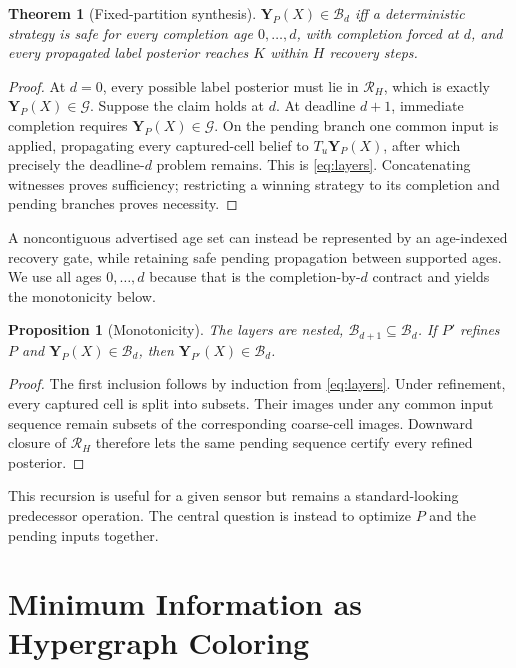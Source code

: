 \documentclass[letterpaper,10pt,conference]{ieeeconf}
\newtheorem{theorem}{Theorem}
\newtheorem{proposition}{Proposition}
\newcommand{\cR}{\mathcal R}
\newcommand{\cB}{\mathcal B}
\begin{document}
\begin{theorem}[Fixed-partition synthesis]\label{thm:fixed}
\mbox{$\mathbf Y_P(X)\in\cB_d$} iff a deterministic strategy is safe for every completion age
$0,\ldots,d$, with completion forced at $d$, and every propagated label posterior reaches $K$
within $H$ recovery steps.
\end{theorem}
\begin{proof}
At $d=0$, every possible label posterior must lie in $\cR_H$, which is exactly
$\mathbf Y_P(X)\in\mathcal G$. Suppose the claim holds at $d$. At deadline $d+1$, immediate
completion requires $\mathbf Y_P(X)\in\mathcal G$. On the pending branch one common input is
applied, propagating every captured-cell belief to $T_u\mathbf Y_P(X)$, after which precisely the
deadline-$d$ problem remains. This is \eqref{eq:layers}. Concatenating witnesses proves
sufficiency; restricting a winning strategy to its completion and pending branches proves
necessity.
\end{proof}

A noncontiguous advertised age set can instead be represented by an age-indexed recovery gate,
while retaining safe pending propagation between supported ages. We use all ages
$0,\ldots,d$ because that is the completion-by-$d$ contract and yields the monotonicity below.

\begin{proposition}[Monotonicity]
The layers are nested, $\cB_{d+1}\subseteq\cB_d$. If $P'$ refines $P$ and
$\mathbf Y_P(X)\in\cB_d$, then $\mathbf Y_{P'}(X)\in\cB_d$.
\end{proposition}
\begin{proof}
The first inclusion follows by induction from \eqref{eq:layers}. Under refinement, every captured
cell is split into subsets. Their images under any common input sequence remain subsets of the
corresponding coarse-cell images. Downward closure of $\cR_H$ therefore lets the same pending
sequence certify every refined posterior.
\end{proof}

This recursion is useful for a given sensor but remains a standard-looking predecessor operation.
The central question is instead to optimize $P$ and the pending inputs together.

\section{Minimum Information as Hypergraph Coloring}
\end{document}
